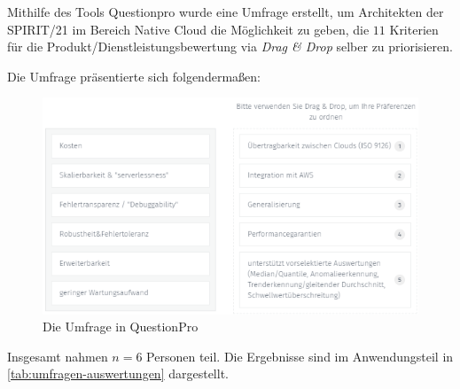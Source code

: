 \label{anhang:umfrage}
Mithilfe des Tools Questionpro wurde eine Umfrage erstellt, um Architekten der SPIRIT/21 im Bereich Native Cloud die Möglichkeit zu geben, die $11$ Kriterien für die Produkt/Dienstleistungsbewertung via \textit{Drag \& Drop} selber zu priorisieren.

Die Umfrage präsentierte sich folgendermaßen:

\begin{figure}[H]
\centering
\includegraphics[width=\textwidth]{graphics/Umfrage-Darstellung.png}
\caption{Die Umfrage in QuestionPro}
\label{abb:Umfrage}
\end{figure}

Insgesamt nahmen $n = 6$ Personen teil. Die Ergebnisse sind im Anwendungsteil in \autoref{tab:umfragen-auswertungen} dargestellt.